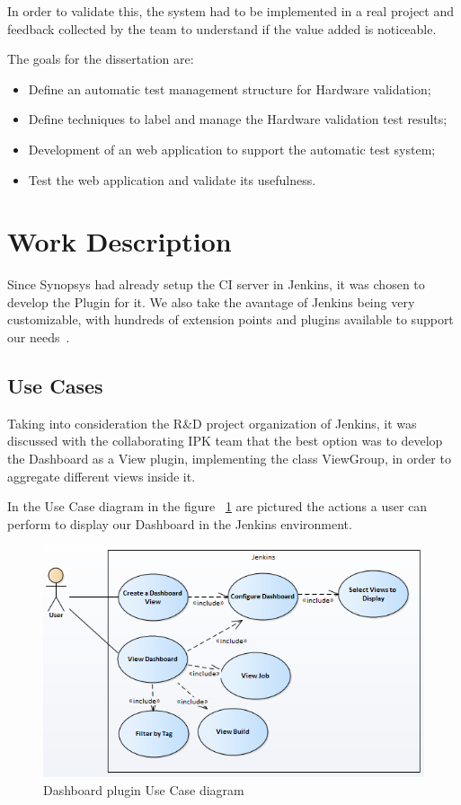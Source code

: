 \documentclass[9pt,a4paper]{extarticle}
\begin{document}
\begin{multicols}{2}
In order to validate this, the system had to be implemented in a real project and feedback collected by the team to understand if the value added is noticeable.

The goals for the dissertation are:

\begin{itemize}
\item Define an automatic test management structure for Hardware validation;
\item Define techniques to label and manage the Hardware validation test results;
\item Development of an web application to support the automatic test system;
\item Test the web application and validate its usefulness.
\end{itemize}

\section{Work Description}\label{sec:work}

Since Synopsys had already setup the CI server in Jenkins, it was chosen to develop the Plugin for it. We also take the avantage of Jenkins being very customizable, with hundreds of extension points and plugins available to support our needs~\cite{kn:Jenkins}.

\subsection{Use Cases}\label{sc:usecases}

Taking into consideration the R\&D project organization of Jenkins, it was discussed with the collaborating IPK team that the best option was to develop the Dashboard as a View plugin, implementing the class ViewGroup, in order to aggregate different views inside it.

In the Use Case diagram in the figure ~\ref{fig:usecases} are pictured the actions a user can perform to display our Dashboard in the Jenkins environment. 

\newcommand{\code}{\texttt}

\begin{figure}[H]
\centerline{\includegraphics[scale=.5]{figures/usecases.png}}
\caption{Dashboard plugin Use Case diagram}  
\label{fig:usecases}
\end{figure}


\end{multicols}
\end{document}
